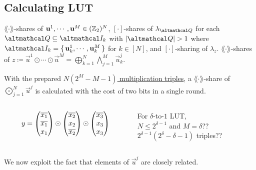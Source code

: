 \documentclass[../240906_cryptlab_flute.tex]{subfiles}
\begin{document}
\subsection{Calculating LUT}
\begin{frame}{}
    \begin{exampleblock}{}
        \begin{description}[Output]
            \ii[Input]
            \(\lang\cdot\rang\)-shares of \(\boldsymbol{\mathbf{u}}^1, \cdots, \boldsymbol{\mathbf{u}}^M \in (\mathbb{Z}_2)^N\),
            \([\cdot]\)-shares of \(\lambda_{\mcal{Q}}\) for each \(\mcal{Q} \subseteq \mcal{I}_k\)
            with \(|\mcal{Q}| > 1\) where \(\mcal{I}_k = \{\,\vec{u}^1_k,\cdots,\vec{u}^M_k\,\}\)
            for \(k \in [N]\),
            and \([\cdot]\)-sharing of \(\lambda_z\).
            \ii[Output]
            \(\lang\cdot\rang\)-shares of
            \(z \coloneqq \vec{u}^1 \odot \cdots \odot \vec{u}^M = \bigoplus_{k=1}^N \bigwedge_{j=1}^M \vec{u}^j_k\).
        \end{description}
        With the prepared \ul{\(N(2^M - M - 1)\) multiplication triples},
        a \(\lang\cdot\rang\)-share of \(\bigodot_{j=1}^N \vec{u}^j\)
        is calculated with the cost of two bits in a single round.
    \end{exampleblock}

    \pause
    \begin{columns}
        \begin{column}{.5\textwidth}
            \begin{equation*}
                y
                = \begin{pmatrix} \overline{x_1} \\ \overline{x_1} \\ x_1 \end{pmatrix}
                   \odot \begin{pmatrix} \overline{x_2} \\ x_2 \\ \overline{x_2} \end{pmatrix}
                   \odot \begin{pmatrix} \overline{x_3} \\ x_3 \\ x_3 \end{pmatrix}
            \end{equation*}
        \end{column}
        \begin{column}{.5\textwidth}
            \centering
            For \(\delta\)-to-\(1\) LUT, \\
            \(N \le 2^{\delta - 1}\) and \(M = \delta\)?? \\
            \pause
            \(2^{\delta-1}(2^\delta-\delta-1)\) triples??
        \end{column}
    \end{columns}

    \pause
    \begin{alertblock}{}
        We now exploit the fact that elements of \(\vec{u}^j\) are closely related.
        \centerline{}
    \end{alertblock}
\end{frame}
\end{document}
